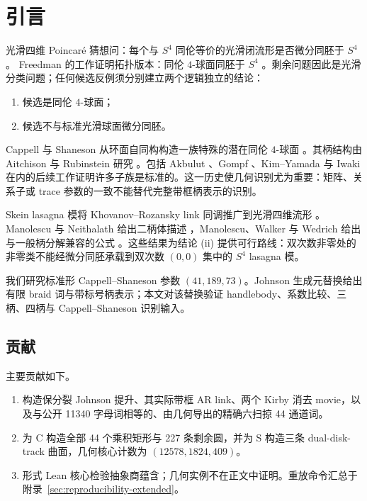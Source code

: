 \section{引言}

光滑四维 Poincaré 猜想问：每个与 $S^4$ 同伦等价的光滑闭流形是否微分同胚于 $S^4$。
Freedman 的工作证明拓扑版本：同伦 $4$-球面同胚于 $S^4$ \cite{Freedman1982}。剩余问题因此是光滑分类问题；任何候选反例须分别建立两个逻辑独立的结论：
\begin{enumerate}
\item 候选是同伦 $4$-球面；
\item 候选不与标准光滑球面微分同胚。
\end{enumerate}

Cappell 与 Shaneson 从环面自同构构造一族特殊的潜在同伦 $4$-球面 \cite{CappellShaneson1976}。其柄结构由 Aitchison 与 Rubinstein 研究 \cite{AitchisonRubinstein1984}。包括 Akbulut \cite{Akbulut2010}、Gompf \cite{Gompf2010}、Kim--Yamada \cite{KimYamada2017} 与 Iwaki \cite{Iwaki2024} 在内的后续工作证明许多子族是标准的。这一历史使几何识别尤为重要：矩阵、关系子或 trace 参数的一致不能替代完整带框柄表示的识别。

Skein lasagna 模将 Khovanov--Rozansky link 同调推广到光滑四维流形 \cite{MorrisonWalkerWedrich2019}。Manolescu 与 Neithalath 给出二柄体描述 \cite{ManolescuNeithalath2020}，Manolescu、Walker 与 Wedrich 给出与一般柄分解兼容的公式 \cite{ManolescuWalkerWedrich2023}。这些结果为结论 (ii) 提供可行路线：双次数非零处的非零类不能经微分同胚承载到双次数 $(0,0)$ 集中的 $S^4$ lasagna 模。

我们研究标准形 Cappell--Shaneson 参数 $(41,189,73)$。Johnson 生成元替换给出有限 braid 词与带标号柄表示；本文对该替换验证 handlebody、系数比较、三柄、四柄与 Cappell--Shaneson 识别输入。

\subsection*{贡献}

主要贡献如下。
\begin{enumerate}
\item 构造保分裂 Johnson 提升、其实际带框 AR link、两个 Kirby 消去 movie，以及与公开 11340 字母词相等的、由几何导出的精确六扫掠 44 通道词。
\item 为 C 构造全部 44 个乘积矩形与 227 条剩余圆，并为 S 构造三条 dual-disk-track 曲面，几何核心计数为 $(12578,1824,409)$。
\item 形式 Lean 核心检验抽象商蕴含；几何实例不在正文中证明。重放命令汇总于附录~\ref{sec:reproducibility-extended}。
\end{enumerate}

